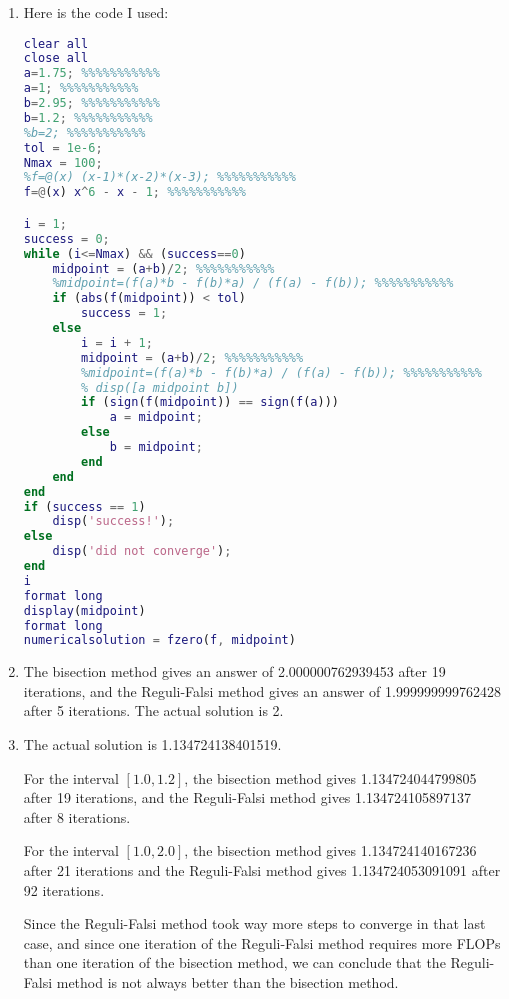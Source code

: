 \documentclass{article}
\begin{document}
\bigskip
\begin{prob}
\end{prob}
\begin{enumerate}[label=(\alph*)]
    \item Here is the code I used:

\begin{lstlisting}[language=Matlab]
clear all
close all
a=1.75; %%%%%%%%%%%
a=1; %%%%%%%%%%%
b=2.95; %%%%%%%%%%%
b=1.2; %%%%%%%%%%%
%b=2; %%%%%%%%%%%
tol = 1e-6;
Nmax = 100;
%f=@(x) (x-1)*(x-2)*(x-3); %%%%%%%%%%%
f=@(x) x^6 - x - 1; %%%%%%%%%%%

i = 1;
success = 0;
while (i<=Nmax) && (success==0)
    midpoint = (a+b)/2; %%%%%%%%%%%
    %midpoint=(f(a)*b - f(b)*a) / (f(a) - f(b)); %%%%%%%%%%%
    if (abs(f(midpoint)) < tol)
        success = 1;
    else
        i = i + 1;
        midpoint = (a+b)/2; %%%%%%%%%%%
        %midpoint=(f(a)*b - f(b)*a) / (f(a) - f(b)); %%%%%%%%%%%
        % disp([a midpoint b])
        if (sign(f(midpoint)) == sign(f(a)))
            a = midpoint;
        else
            b = midpoint;
        end
    end
end
if (success == 1)
    disp('success!');
else
    disp('did not converge');
end
i
format long
display(midpoint)
format long
numericalsolution = fzero(f, midpoint)
\end{lstlisting}

    \item The bisection method gives an answer of 2.000000762939453 after 19 iterations, and the Reguli-Falsi method gives an answer of 1.999999999762428 after 5 iterations. The actual solution is 2.
    \item The actual solution is 1.134724138401519.
        \par
        For the interval $[1.0, 1.2]$, the bisection method gives 1.134724044799805 after 19 iterations, and the Reguli-Falsi method gives 1.134724105897137 after 8 iterations.
        \par
        For the interval $[1.0, 2.0]$, the bisection method gives 1.134724140167236 after 21 iterations and the Reguli-Falsi method gives 1.134724053091091 after 92 iterations.
        \par
        Since the Reguli-Falsi method took way more steps to converge in that last case, and since one iteration of the Reguli-Falsi method requires more FLOPs than one iteration of the bisection method, we can conclude that the Reguli-Falsi method is not always better than the bisection method.
\end{enumerate}
\end{document}
